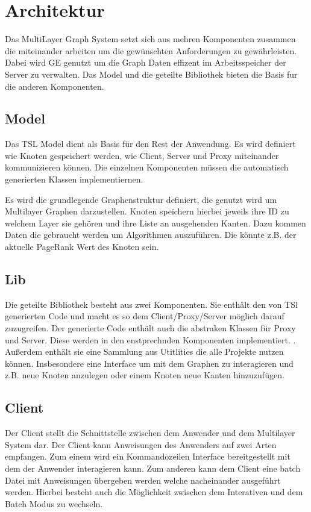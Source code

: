 
\section{Architektur}

Das MultiLayer Graph System setzt sich aus mehren Komponenten zusammen die miteinander arbeiten um die gewünschten Anforderungen zu gewährleisten.
Dabei wird GE genutzt um die Graph Daten effizent im Arbeitsspeicher der Server zu verwalten.  Das Model und die geteilte Bibliothek bieten die Basis fur die
anderen Komponenten.

\subsection{Model}

Das TSL Model dient als Basis für den Rest der Anwendung. Es wird definiert wie Knoten gespeichert werden, wie Client, Server und Proxy miteinander
kommunizieren können. Die einzelnen Komponenten müssen die automatisch generierten Klassen implementiernen.

Es wird die grundlegende Graphenstruktur definiert, die genutzt wird um Multilayer Graphen darzustellen. Knoten speichern hierbei jeweils ihre ID zu welchem Layer sie gehören
und ihre Liste an ausgehenden Kanten. Dazu kommen Daten die gebraucht werden um Algorithmen auszuführen. Die könnte z.B. der aktuelle PageRank Wert des Knoten sein.




\subsection{Lib}

Die geteilte Bibliothek besteht aus zwei Komponenten. Sie enthält den von TSl generierten Code und macht es so dem Client/Proxy/Server möglich darauf zuzugreifen. Der generierte Code enthält auch die abstraken Klassen für Proxy und Server. Diese werden in den enstprechnden Komponenten implementiert. . Außerdem enthält sie
eine Sammlung aus Utitlities die alle Projekte nutzen können. Insbesondere eine Interface um mit dem Graphen zu interagieren und z.B. neue Knoten anzulegen oder einem Knoten neue Kanten hinzuzufügen.


\subsection{Client}

Der Client stellt die Schnittstelle zwischen dem Anwender und dem Multilayer System dar. Der Client kann Anweisungen des Anwenders auf zwei Arten empfangen.
Zum einem wird ein Kommandozeilen Interface bereitgestellt mit dem der Anwender interagieren kann. Zum anderen kann dem Client eine batch Datei mit Anweisungen übergeben werden
welche nacheinander ausgeführt werden.
Hierbei besteht auch die Möglichkeit zwischen dem Interativen und dem Batch Modus zu wechseln.

